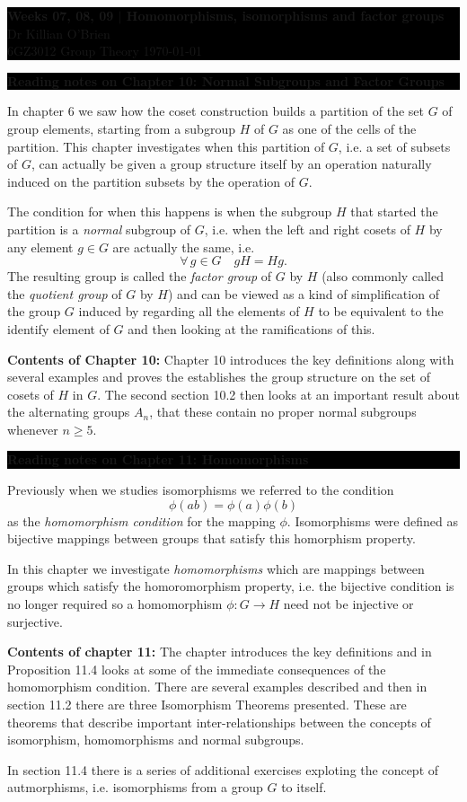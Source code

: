 \documentclass[oneside,10pt]{amsart}
\newcommand{\cbox}[1]{\colorbox{black}{\begin{minipage}{\linewidth}\color{white}\sffamily #1 \end{minipage}}}
\newcommand{\tuttitle}[4]{\cbox{\textbf{#1} \hfill {#2}\\{#3} \hfill {\Small #4}}\vskip 4pt}
\newcommand{\topic}[1]{\cbox{\textbf{#1}}\vskip 4pt}
\begin{document}
\tuttitle{Weeks 07, 08, 09 $|$ Homomorphisms, isomorphisms and factor groups}{Dr Killian O'Brien}{6GZ3012 Group Theory}{\today}
\vskip 16pt

\topic{Reading notes on Chapter 10: Normal Subgroups and Factor Groups}
In chapter 6 we saw how the coset construction builds a partition of the set $G$ of group elements, starting from a subgroup $H$ of $G$ as one of the cells of the partition. This chapter investigates when this partition of $G$, i.e. a set of subsets of $G$, can actually be given a group structure itself by an operation naturally induced on the partition subsets by the operation of $G$.

The condition for when this happens is when the subgroup $H$ that started the partition is a \emph{normal} subgroup of $G$, i.e. when the left and right cosets of $H$ by any element $g \in G$ are actually the same, i.e.
$$ \forall \, g \in G \quad gH = Hg.$$
The resulting group is called the \emph{factor group} of $G$ by $H$ (also commonly called the \emph{quotient group} of $G$ by $H$) and can be viewed as a kind of simplification of the group $G$ induced by regarding all the elements of $H$ to be equivalent to the identify element of $G$ and then looking at the ramifications of this.
\vskip 6pt

\textbf{Contents of Chapter 10:}
Chapter 10 introduces the key definitions along with several examples and proves the establishes the group structure on the set of cosets of $H$ in $G$. The second section 10.2 then looks at an important result about the alternating groups $A_n$, that these contain no proper normal subgroups whenever $n \geq 5$.
\vskip 12pt

\topic{Reading notes on Chapter 11: Homomorphisms}
Previously when we studies isomorphisms we referred to the condition
$$\phi(ab) = \phi(a)\phi(b)$$
as the \emph{homomorphism condition} for the mapping $\phi$. Isomorphisms were defined as bijective mappings between groups that satisfy this homorphism property.

In this chapter we investigate \emph{homomorphisms} which are mappings between groups which satisfy the homoromorphism property, i.e. the bijective condition is no longer required so a homomorphism $\phi:G \to H$ need not be injective or surjective.
\vskip 6pt

\textbf{Contents of chapter 11:}
The chapter introduces the key definitions and in Proposition 11.4 looks at some of the immediate consequences of the homomorphism condition. There are several examples described and then in section 11.2 there are three Isomorphism Theorems presented. These are theorems that describe important inter-relationships between the concepts of isomorphism, homomorphisms and normal subgroups.

In section 11.4 there is a series of additional exercises exploting the concept of autmorphisms, i.e. isomorphisms from a group $G$ to itself.
\end{document}
